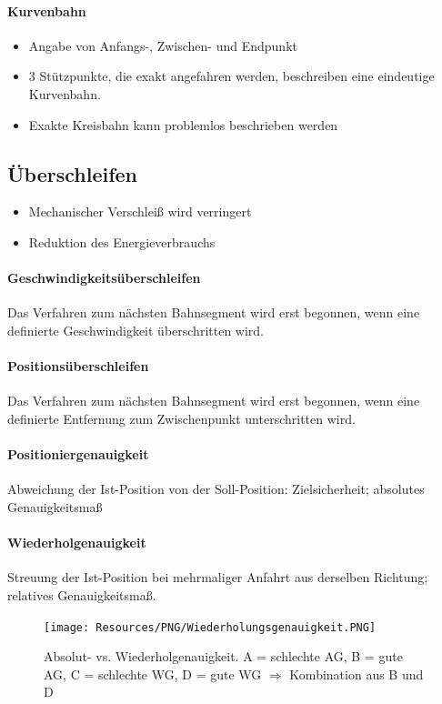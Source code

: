 \paragraph{Kurvenbahn}
\begin{itemize}
	\item Angabe von Anfangs-, Zwischen- und Endpunkt
	\item 3 Stützpunkte, die exakt angefahren werden, beschreiben eine eindeutige Kurvenbahn.
	\item Exakte Kreisbahn kann problemlos beschrieben werden
\end{itemize}
\subsection{Überschleifen}
\begin{itemize}
	\item Mechanischer Verschleiß wird verringert
	\item Reduktion des Energieverbrauchs
\end{itemize}
\paragraph{Geschwindigkeitsüberschleifen}
Das Verfahren zum nächsten Bahnsegment wird erst begonnen, wenn eine definierte Geschwindigkeit überschritten wird.
\paragraph{Positionsüberschleifen}
Das Verfahren zum nächsten Bahnsegment wird erst begonnen, wenn eine definierte Entfernung zum Zwischenpunkt unterschritten wird.
\paragraph{Positioniergenauigkeit}
Abweichung der Ist-Position von der Soll-Position: Zielsicherheit; absolutes Genauigkeitsmaß
\paragraph{Wiederholgenauigkeit}
Streuung der Ist-Position bei mehrmaliger Anfahrt aus derselben Richtung; relatives Genauigkeitsmaß.
\begin{figure}[H]
	\begin{center}
		\texttt{[image: Resources/PNG/Wiederholungsgenauigkeit.PNG]}
		\caption{Absolut- vs. Wiederholgenauigkeit. A = schlechte AG, B = gute AG, C = schlechte WG, D = gute WG $\Rightarrow$ Kombination aus B und D}
		\label{fig:PNG/Wiederholungsgenauigkeit.PNG}
	\end{center}
\end{figure}
